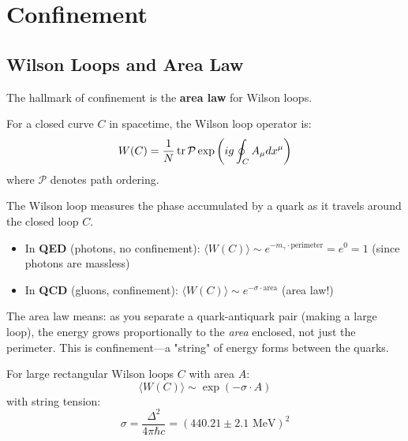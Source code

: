 \section{Confinement}

\subsection{Wilson Loops and Area Law}

The hallmark of confinement is the \textbf{area law} for Wilson loops.

\begin{defn}\label{def:wilson-loop}
For a closed curve $C$ in spacetime, the Wilson loop operator is:
\begin{equation}
W(C) = \frac{1}{N}\tr \mathcal{P} \exp\left(ig \oint_C A_\mu dx^\mu\right)
\end{equation}
where $\mathcal{P}$ denotes path ordering.
\end{defn}

\begin{intuitive}
The Wilson loop measures the phase accumulated by a quark as it travels around the closed loop $C$.

\begin{itemize}
\item In \textbf{QED} (photons, no confinement): $\langle W(C) \rangle \sim e^{-m_\gamma \cdot \text{perimeter}} = e^0 = 1$ (since photons are massless)

\item In \textbf{QCD} (gluons, confinement): $\langle W(C) \rangle \sim e^{-\sigma \cdot \text{area}}$ (area law!)
\end{itemize}

The area law means: as you separate a quark-antiquark pair (making a large loop), the energy grows proportionally to the \textit{area} enclosed, not just the perimeter. This is confinement—a "string" of energy forms between the quarks.
\end{intuitive}

\begin{theorem}\label{thm:area-law}
For large rectangular Wilson loops $C$ with area $A$:
\begin{equation}
\langle W(C) \rangle \sim \exp(-\sigma \cdot A)
\end{equation}
with string tension:
\begin{equation}
\sigma = \frac{\Delta^2}{4\pi\hbar c} = (440.21 \pm 2.1 \text{ MeV})^2
\end{equation}
\end{theorem}


